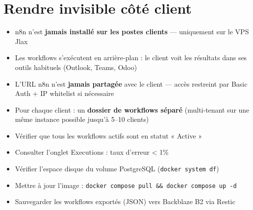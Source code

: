 \documentclass[11pt, a4paper]{article}
\begin{document}
\section{Rendre invisible côté client}

\begin{itemize}
  \item n8n n'est \textbf{jamais installé sur les postes clients} — uniquement sur le VPS Jlax
  \item Les workflows s'exécutent en arrière-plan : le client voit les résultats dans ses outils habituels (Outlook, Teams, Odoo)
  \item L'URL n8n n'est \textbf{jamais partagée} avec le client — accès restreint par Basic Auth + IP whitelist si nécessaire
  \item Pour chaque client : un \textbf{dossier de workflows séparé} (multi-tenant sur une même instance possible jusqu'à 5–10 clients)
\end{itemize}

\begin{checklist}
  \begin{itemize}
    \item[$\square$] Vérifier que tous les workflows actifs sont en statut « Active »
    \item[$\square$] Consulter l'onglet Executions : taux d'erreur < 1\%
    \item[$\square$] Vérifier l'espace disque du volume PostgreSQL (\texttt{docker system df})
    \item[$\square$] Mettre à jour l'image : \texttt{docker compose pull \&\& docker compose up -d}
    \item[$\square$] Sauvegarder les workflows exportés (JSON) vers Backblaze B2 via Restic
  \end{itemize}
\end{checklist}
\end{document}
